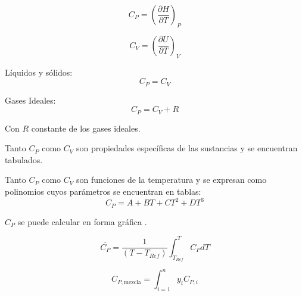             \begin{equation}
            \label{eq:c_p}
                C_{P} = \left ( \frac{\partial H}{\partial T} \right )_{P}
            \end{equation}
            
            
            \begin{quote}
                \textit{}
            \end{quote}
            
            \begin{equation}
            \label{eq:c_v}
                C_{V} = \left ( \frac{\partial U}{\partial T} \right )_{V}
            \end{equation}
            
            
            Líquidos y sólidos:
            \[C_{P} = C_{V}\]
            
            Gases Ideales:
            \[C_{P} = C_{V} + R\]
            
            Con \(R\) constante de los gases ideales.
            
            Tanto \(C_{P}\) como \(C_{V}\) son propiedades específicas de las sustancias y se encuentran tabulados.
            
            Tanto \(C_{P}\) como \(C_{V}\) son funciones de la temperatura y se expresan como polinomios cuyos parámetros se encuentran en tablas:
            \[C_{P} = A + BT + C{T}^{2} + D{T}^{3}\]
            
            \(C_{P}\) se puede calcular en forma gráfica \cite{perry_perrys_1963}.
            
            
            \begin{equation}
            \label{eq:cp_promedio}
                \overline{C_{P}} = \frac{1}{\left ( T - T_{Ref} \right )} \int_{T_{Ref}}^{T} C_{P} dT
            \end{equation}
            
            
            \begin{equation}
            \label{eq:cp_mezcla}
                C_{P, \text{mezcla}} = \int_{i = 1}^{n} y_{i}C_{P, i}
            \end{equation}
        
